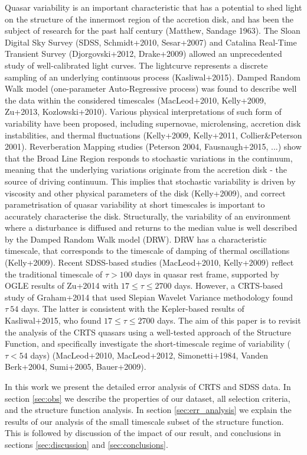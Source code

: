 \documentclass[a4paper,fleqn,usenatbib]{mnras}
\begin{document}
Quasar variability is an important characteristic that has a potential to shed light on the structure of the innermost region of the accretion disk, and has been the subject of research for the past half century (Matthew, Sandage 1963). The Sloan Digital Sky Survey (SDSS, Schmidt+2010, Sesar+2007) and Catalina Real-Time Transient Survey (Djorgovski+2012, Drake+2009) allowed an unprecedented study of well-calibrated light curves. The lightcurve represents a discrete sampling of an underlying continuous process (Kasliwal+2015). Damped Random Walk model (one-parameter Auto-Regressive process) was found to describe well the data within the considered timescales (MacLeod+2010, Kelly+2009, Zu+2013, Kozlowski+2010). Various physical interpretations of such form of variability have been proposed, including supernovae, microlensing, accretion disk instabilities, and thermal fluctuations  (Kelly+2009, Kelly+2011, Collier\&Peterson 2001). Reverberation Mapping studies (Peterson 2004, Fausnaugh+2015, ...) show that the Broad Line Region responds to stochastic variations in the continuum, meaning that the underlying variations originate from the accretion disk - the source of driving continuum. This implies that stochastic variability is driven by viscosity and other physical parameters of the disk (Kelly+2009), and correct parametrisation of quasar variability at short timescales is important to accurately characterise the disk.
 Structurally, the variability of an environment where a disturbance is diffused and returns to the median value is well described by the  Damped Random Walk model (DRW). DRW has a characteristic timescale, that corresponds to the timescale of damping of thermal oscillations (Kelly+2009).  Recent SDSS-based studies (MacLeod+2010, Kelly+2009) reflect the traditional timescale of $\tau > 100 $ days in quasar rest frame, supported by OGLE results of Zu+2014 with $ 17 \leq \tau \leq 2700 $ days. However, a CRTS-based study of Graham+2014 that used Slepian Wavelet Variance methodology found $\tau ~ 54$ days. The latter is consistent with the Kepler-based results of Kasliwal+2015, who found   $ 17 \leq \tau \leq 2700 $ days.  The aim of this paper is to revisit the analysis of the CRTS quasars using a  well-tested approach of the Structure Function, and specifically investigate the short-timescale regime of variability ($\tau < 54$ days)  (MacLeod+2010, MacLeod+2012, Simonetti+1984, Vanden Berk+2004, Sumi+2005, Bauer+2009). 
 
In this work we present the detailed error analysis of CRTS and SDSS data. In section \ref{sec:obs} we describe the properties of our dataset, all selection criteria, and the structure function analysis.  In section \ref{sec:err_analysis} we explain the results of our analysis of the small timescale subset of the structure function. This is followed by discussion of the impact of our result, and conclusions in sections \ref{sec:discussion} and \ref{sec:conclusions}.
 
\end{document}
